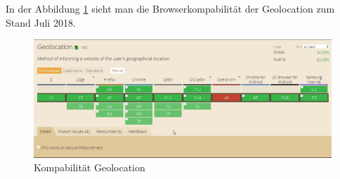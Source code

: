 In der Abbildung \ref{fig:BrowserGL} sieht man die Browserkompabilität der Geolocation zum Stand Juli 2018.
\begin{figure}[h]
	\centering
	\includegraphics[width=14cm]{BilderAllgemein/BrowserGL}\medskip
	\caption{Kompabilität Geolocation \cite{BrowserSupport}}
	\label{fig:BrowserGL}
\end{figure}









